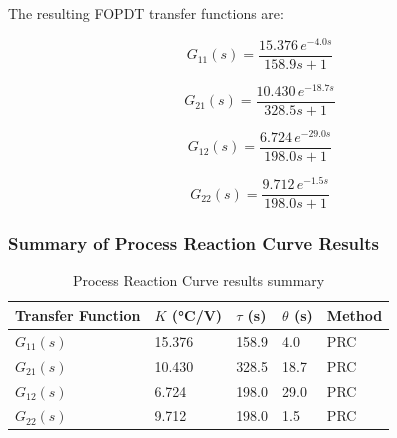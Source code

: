 The resulting FOPDT transfer functions are:

\begin{equation}
    G_{11}(s) = \frac{15.376\, e^{-4.0s}}{158.9s + 1}
    \label{eq:G11}
\end{equation}

\begin{equation}
    G_{21}(s) = \frac{10.430\, e^{-18.7s}}{328.5s + 1}
    \label{eq:G21}
\end{equation}

\begin{equation}
    G_{12}(s) = \frac{6.724\, e^{-29.0s}}{198.0s + 1}
    \label{eq:G12}
\end{equation}

\begin{equation}
    G_{22}(s) = \frac{9.712\, e^{-1.5s}}{198.0s + 1}
    \label{eq:G22}
\end{equation}

\subsubsection{Summary of Process Reaction Curve Results}

\begin{table}[H]
\centering
\renewcommand{\arraystretch}{1.5}
\caption{Process Reaction Curve results summary}
\begin{tabular}{lllll}
\hline
Transfer Function & $K$ (°C/V) & $\tau$ (s) & $\theta$ (s) & Method \\
\hline
$G_{11}(s)$ & 15.376 & 158.9 & 4.0  & PRC \\
$G_{21}(s)$ & 10.430 & 328.5 & 18.7 & PRC \\
$G_{12}(s)$ & 6.724  & 198.0 & 29.0 & PRC \\
$G_{22}(s)$ & 9.712  & 198.0 & 1.5  & PRC \\
\hline
\end{tabular}
\end{table}


